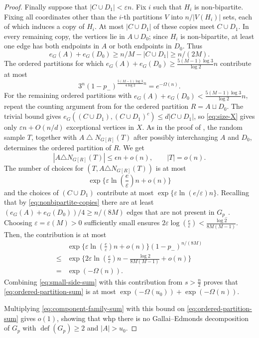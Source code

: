 \documentclass[10pt,a4paper]{article}
\newcommand{\defi}{\operatorname{def}}
\begin{document}
\begin{proof}
Finally suppose that $|C \cup D_1|<\varepsilon n$.
Fix $i$ such that $H_i$ is non-bipartite.
Fixing all coordinates other than the $i$-th partitions $V$ into $n/|V(H_i)|$ sets, each of which induces a copy of $H_i$.
At most $|C \cup D_1|$ of these copies meet $C \cup D_1$.
In every remaining copy, the vertices lie in $A\cup D_0$; since $H_i$ is non-bipartite, at least one edge has both endpoints in $A$ or both endpoints in $D_0$.
Thus
\begin{equation}\label{eq:nonbipartite-copies}
 e_G(A)+e_G(D_0)\ge n/M-|C \cup D_1|\ge n/(2M).
\end{equation}
The ordered partitions for which $e_G(A)+e_G(D_0)\ge \frac{5(M-1)\log 3}{\log 2}n$ contribute at most
\[
 3^n (1-p_-)^{\frac{5(M-1)\log 3}{4 \log 2} n}=e^{-\Omega(n)}.
\]
For the remaining ordered partitions with $e_G(A)+e_G(D_0)< \frac{5(M-1)\log 3}{\log 2}n$, repeat the counting argument from  for the ordered partition $R=A\sqcup D_0$.
The trivial bound gives $e_G((C \cup D_1), (C \cup D_1)^c)\le d|C \cup D_1|$, so \eqref{eq:size-X} gives only $\varepsilon n+O(n/d)$ exceptional vertices in $X$.
As in the proof of , the random sample $T$, together with $A\mathbin{\triangle}N_{G[R]}(T)$ after possibly interchanging $A$ and $D_0$, determines the ordered partition of $R$. We get
\[
|A \triangle N_{G[R]}(T)| \leq \epsilon n + o(n), \qquad |T|=o(n).
\]
The number of choices for $(T, A \triangle N_{G[R]}(T))$ is at most
\[
 \exp\{\varepsilon\ln\left(\frac{e}{\varepsilon} \right)n+o(n)\}
\]
and the choices of $(C \cup D_1)$ contribute at most $\exp\{\varepsilon\ln(e/\varepsilon)n\}$.
Recalling that by \eqref{eq:nonbipartite-copies} there are at least $(e_G(A)+e_G(D_0))/4 \geq n/(8M)$ edges that are not present in $G_{p_-}$. Choosing $\varepsilon=\varepsilon(M)>0$ sufficiently small ensures $2 \varepsilon \log\left( \frac{e}{\varepsilon}\right) < \frac{\log 2}{8M(M-1)}$. Then, the contribution is at most
\begin{align*}
    &\exp\{\varepsilon\ln\left(\frac{e}{\varepsilon} \right)n+o(n)\} (1-p_-)^{n/(8M)}\\
 \leq &\exp\{2 \varepsilon\ln\left(\frac{e}{\varepsilon} \right)n - \frac{\log 2}{8M(M-1)} +o(n)\}\\
 = & \exp(-\Omega(n)).
\end{align*}
Combining \eqref{eq:small-side-sum} with this contribution from $s>\frac{n}{2}$ proves that \eqref{eq:ordered-partition-sum} is at most $\exp(-\Omega(u_0))+ \exp(-\Omega(n))$.

Multiplying \eqref{eq:component-family-sum} with this bound on \eqref{eq:ordered-partition-sum} gives $o(1)$, showing that whp there is no Gallai--Edmonds decomposition of $G_p$ with $\defi(G_p)\ge2$ and $|A|>u_0$.
\end{proof}
\end{document}
